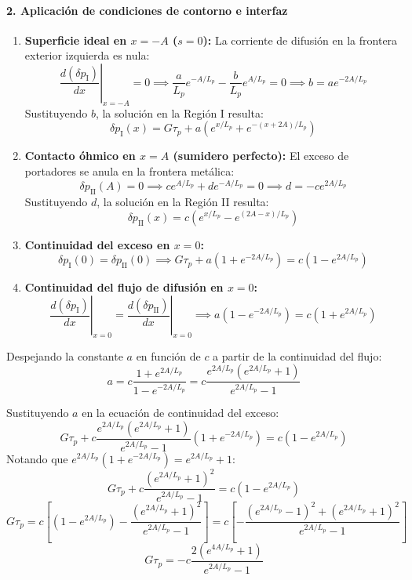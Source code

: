 \begin{problema}
\paragraph{2. Aplicación de condiciones de contorno e interfaz}
\begin{enumerate}
    \item \textbf{Superficie ideal en $x = -A$ ($s = 0$):} La corriente de difusión en la frontera exterior izquierda es nula:
    \[
    \left. \frac{d(\delta p_{\text{I}})}{dx} \right|_{x=-A} = 0 \implies \frac{a}{L_p} e^{-A/L_p} - \frac{b}{L_p} e^{A/L_p} = 0 \implies b = a e^{-2A/L_p}
    \]
    Sustituyendo $b$, la solución en la Región I resulta:
    \[
    \delta p_{\text{I}}(x) = G \tau_p + a \left( e^{x/L_p} + e^{-(x+2A)/L_p} \right)
    \]

    \item \textbf{Contacto óhmico en $x = A$ (sumidero perfecto):} El exceso de portadores se anula en la frontera metálica:
    \[
    \delta p_{\text{II}}(A) = 0 \implies c e^{A/L_p} + d e^{-A/L_p} = 0 \implies d = -c e^{2A/L_p}
    \]
    Sustituyendo $d$, la solución en la Región II resulta:
    \[
    \delta p_{\text{II}}(x) = c \left( e^{x/L_p} - e^{(2A-x)/L_p} \right)
    \]

    \item \textbf{Continuidad del exceso en $x = 0$:}
    \[
    \delta p_{\text{I}}(0) = \delta p_{\text{II}}(0) \implies G \tau_p + a \left( 1 + e^{-2A/L_p} \right) = c \left( 1 - e^{2A/L_p} \right)
    \]

    \item \textbf{Continuidad del flujo de difusión en $x = 0$:}
    \[
    \left. \frac{d(\delta p_{\text{I}})}{dx} \right|_{x=0} = \left. \frac{d(\delta p_{\text{II}})}{dx} \right|_{x=0} \implies a \left( 1 - e^{-2A/L_p} \right) = c \left( 1 + e^{2A/L_p} \right)
    \]
\end{enumerate}

Despejando la constante $a$ en función de $c$ a partir de la continuidad del flujo:
\[
a = c \frac{1 + e^{2A/L_p}}{1 - e^{-2A/L_p}} = c \frac{e^{2A/L_p} \left(e^{2A/L_p} + 1\right)}{e^{2A/L_p} - 1}
\]

Sustituyendo $a$ en la ecuación de continuidad del exceso:
\[
G \tau_p + c \frac{e^{2A/L_p} \left(e^{2A/L_p} + 1\right)}{e^{2A/L_p} - 1} \left( 1 + e^{-2A/L_p} \right) = c \left( 1 - e^{2A/L_p} \right)
\]
Notando que $e^{2A/L_p} \left(1 + e^{-2A/L_p}\right) = e^{2A/L_p} + 1$:
\[
G \tau_p + c \frac{\left(e^{2A/L_p} + 1\right)^2}{e^{2A/L_p} - 1} = c \left( 1 - e^{2A/L_p} \right)
\]
\[
G \tau_p = c \left[ \left(1 - e^{2A/L_p}\right) - \frac{\left(e^{2A/L_p} + 1\right)^2}{e^{2A/L_p} - 1} \right] = c \left[ -\frac{\left(e^{2A/L_p} - 1\right)^2 + \left(e^{2A/L_p} + 1\right)^2}{e^{2A/L_p} - 1} \right]
\]
\[
G \tau_p = -c \frac{2 \left(e^{4A/L_p} + 1\right)}{e^{2A/L_p} - 1}
\]


\end{problema}
